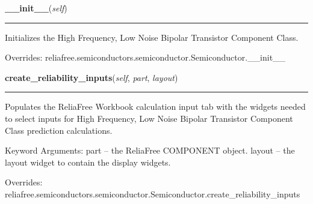     \vspace{0.5ex}

\hspace{.8\funcindent}\begin{boxedminipage}{\funcwidth}

    \raggedright \textbf{\_\_init\_\_}(\textit{self})

    \vspace{-1.5ex}

    \rule{\textwidth}{0.5\fboxrule}
\setlength{\parskip}{2ex}
    Initializes the High Frequency, Low Noise Bipolar Transistor Component 
    Class.

\setlength{\parskip}{1ex}
      Overrides: reliafree.semiconductors.semiconductor.Semiconductor.\_\_init\_\_

    \end{boxedminipage}

    \vspace{0.5ex}

\hspace{.8\funcindent}\begin{boxedminipage}{\funcwidth}

    \raggedright \textbf{create\_reliability\_inputs}(\textit{self}, \textit{part}, \textit{layout})

    \vspace{-1.5ex}

    \rule{\textwidth}{0.5\fboxrule}
\setlength{\parskip}{2ex}
    Populates the ReliaFree Workbook calculation input tab with the widgets
    needed to select inputs for High Frequency, Low Noise Bipolar 
    Transistor Component Class prediction calculations.

    Keyword Arguments: part   -- the ReliaFree COMPONENT object. layout -- 
    the layout widget to contain the display widgets.

\setlength{\parskip}{1ex}
      Overrides: reliafree.semiconductors.semiconductor.Semiconductor.create\_reliability\_inputs

    \end{boxedminipage}

    \vspace{0.5ex}

